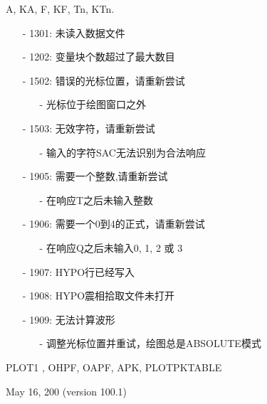 A, KA, F, KF, Tn, KTn.

\begin{itemize}
\item[-]1301: 未读入数据文件
\item[-]1202: 变量块个数超过了最大数目
\end{itemize}

\begin{itemize}
\item[-]1502: 错误的光标位置，请重新尝试
	\begin{itemize}
	\item[-]光标位于绘图窗口之外
	\end{itemize}

\item[-]1503: 无效字符，请重新尝试
	\begin{itemize}
 	\item[-]输入的字符SAC无法识别为合法响应
	\end{itemize}
\item[-]1905: 需要一个整数,请重新尝试
	\begin{itemize}
 	\item[-]在响应T之后未输入整数
	\end{itemize}
\item[-]1906: 需要一个0到4的正式，请重新尝试
	\begin{itemize}
  	\item[-]在响应Q之后未输入0, 1, 2 或 3
	\end{itemize}
\item[-]1907: HYPO行已经写入
\item[-]1908: HYPO震相拾取文件未打开
\item[-] 1909: 无法计算波形
	\begin{itemize}
  	\item[-]调整光标位置并重试，绘图总是ABSOLUTE模式
	\end{itemize}
\end{itemize}

PLOT1 , OHPF, OAPF, APK, PLOTPKTABLE

May 16, 200 (version 100.1)

